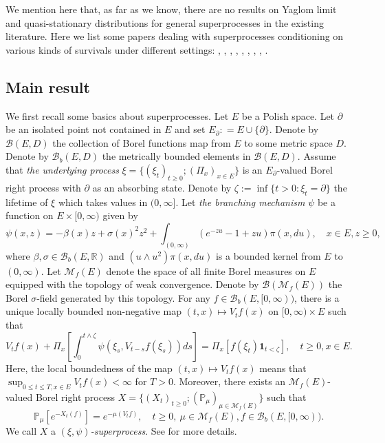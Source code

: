 \documentclass[12pt,a4paper]{amsart}
\numberwithin{equation}{section}
\theoremstyle{plain}
\theoremstyle{definition}
\theoremstyle{remark}
\begin{document}
	We mention here that, as far as we know, there are no results on  Yaglom limit and quasi-stationary distributions for general superprocesses in the existing literature. 
	Here we list some papers dealing with superprocesses conditioning on various kinds of survivals under different settings:
	\cite{ChampagnatRaelly2008Limit}, \cite{Etheridge2003A-decomposition}, \cite{Evans1992The-entrance}, \cite{EvansPerkins1990Measure-valued}, \cite{LiuRen2009Some},  \cite{RenSongSun2019Spine}, \cite{RenSongSun2018Limit}, \cite{RenSongZhang2015Limit}, \cite{Serlet1996Occupation}.

\subsection{Main result} \label{sec:super}

	We first recall some basics about superprocesses.
	Let $E$ be a Polish space.
    Let $\partial$ be an isolated point not contained in $E$ and set $E_\partial: = E \cup \{\partial\}$.
    Denote by $\mathcal B(E, D)$ the collection of Borel functions map from $E$ to some metric space $D$.
    Denote by $\mathcal B_b(E,D)$ the metrically bounded elements in $\mathcal B(E,D)$.
	Assume that \emph{the underlying process} $\xi = \{(\xi_t)_{t\ge0}; (\Pi_x)_{x\in E}\}$ is an $E_\partial$-valued Borel right process with $\partial$ as an absorbing state.
	Denote by $\zeta:=\inf\{t>0: \xi_t=\partial\}$ the lifetime of $\xi$ which takes values in $(0,\infty]$.
	Let \emph{the branching mechanism} $\psi$ be a function on $E \times [0,\infty)$ given by
\begin{equation}
	\psi(x,z)
	= -\beta(x) z + \sigma(x)^2 z^2 + \int_{(0,\infty)} (e^{-zu} -1 + zu) \pi(x,du),
	\quad x\in E, z\geq 0,
\end{equation}
	where $\beta, \sigma \in \mathcal B_b(E,\mathbb R)$ and $(u \wedge u^2) \pi(x,du)$ is a bounded kernel from $E$ to $(0,\infty)$.
	Let $\mathcal M_f(E)$ denote the space of all finite Borel measures on $E$ equipped with the topology of weak convergence.
	Denote by $\mathcal B(\mathcal M_f(E))$ the Borel $\sigma$-field generated by this topology.
	For any $f \in \mathcal B_b(E, [0,\infty))$, there is a unique locally bounded non-negative map $(t,x)\mapsto V_tf(x)$ on $[0,\infty) \times E$ such that
\begin{equation} \label{eq:BGD.1}
	V_tf(x) + \Pi_x \left[ \int_0^{t\wedge \zeta} \psi \left(\xi_s, V_{t-s}f(\xi_s)\right) ds\right]
	= \Pi_x\left[ f(\xi_t) \mathbf 1_{t < \zeta}\right], \quad t\geq 0, x\in E.
\end{equation}
	 Here, the local boundedness of the map $(t,x) \mapsto V_tf(x)$ means that $\sup_{0\leq t\leq T, x\in E} V_tf(x)< \infty$ for $T >0$.
	Moreover, there exists an $\mathcal M_f(E)$-valued Borel right process $X =\{(X_t)_{t\geq 0}; (\mathbb P_\mu)_{\mu \in \mathcal M_f(E)}\}$ such that
\begin{equation}
	\mathbb P_\mu[e^{- X_t(f)}]
	= e^{- \mu(V_tf)},
	\quad t\geq 0,~\mu \in \mathcal M_f(E), f \in \mathcal B_b(E,[0,\infty)).
\end{equation}
	We call $X$ a \emph{$(\xi, \psi)$-superprocess}. 
	See \cite{Li2011MeasureValued} for more details.
\end{document}
